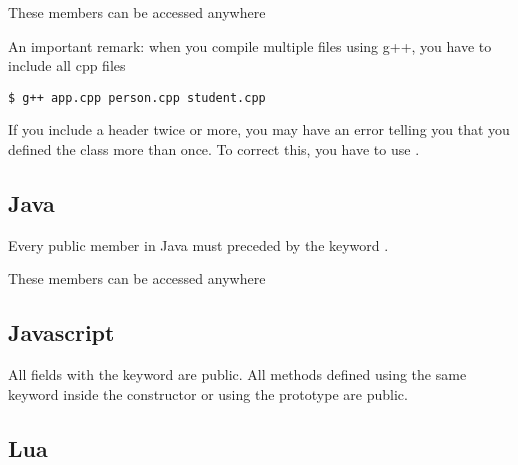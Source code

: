\documentclass{KodeBook}
\begin{document}
These members can be accessed anywhere



An important remark: when you compile multiple files using g++, you have to include all cpp files
\begin{lstlisting}[style=shellStyle]
$ g++ app.cpp person.cpp student.cpp
\end{lstlisting}

If you include a header twice or more, you may have an error telling you that you defined the class more than once. 
To correct this, you have to use .



\subsection{Java}

Every public member in Java must preceded by the keyword . 



These members can be accessed anywhere


\subsection{Javascript} 

All fields with the keyword  are public. 
All  methods defined using the same keyword inside the constructor or using the prototype are public.

%
%
%


\subsection{Lua}

\end{document}
